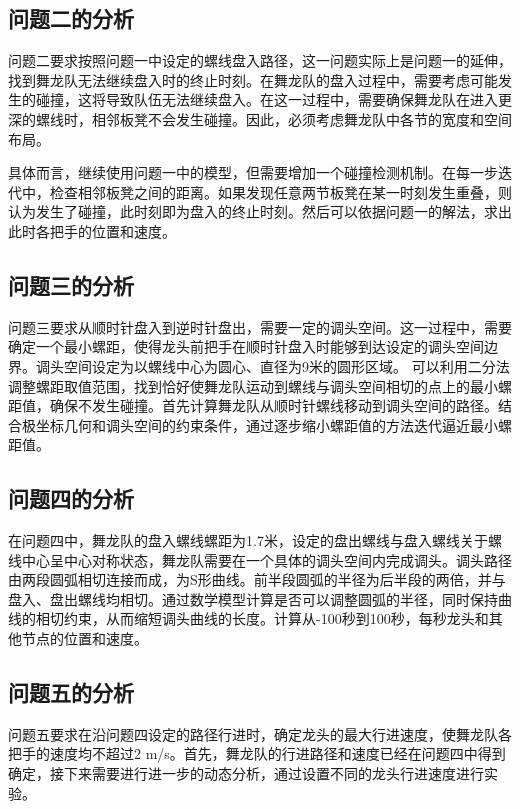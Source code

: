 \documentclass[withoutpreface, bwprint]{cumcmthesis} %
\begin{document}
\subsection{问题二的分析}

问题二要求按照问题一中设定的螺线盘入路径，这一问题实际上是问题一的延伸，找到舞龙队无法继续盘入时的终止时刻。在舞龙队的盘入过程中，需要考虑可能发生的碰撞，这将导致队伍无法继续盘入。在这一过程中，需要确保舞龙队在进入更深的螺线时，相邻板凳不会发生碰撞。因此，必须考虑舞龙队中各节的宽度和空间布局。

具体而言，继续使用问题一中的模型，但需要增加一个碰撞检测机制。在每一步迭代中，检查相邻板凳之间的距离。如果发现任意两节板凳在某一时刻发生重叠，则认为发生了碰撞，此时刻即为盘入的终止时刻。然后可以依据问题一的解法，求出此时各把手的位置和速度。

\subsection{问题三的分析}

问题三要求从顺时针盘入到逆时针盘出，需要一定的调头空间。这一过程中，需要确定一个最小螺距，使得龙头前把手在顺时针盘入时能够到达设定的调头空间边界。调头空间设定为以螺线中心为圆心、直径为9米的圆形区域。
可以利用二分法调整螺距取值范围，找到恰好使舞龙队运动到螺线与调头空间相切的点上的最小螺距值，确保不发生碰撞。首先计算舞龙队从顺时针螺线移动到调头空间的路径。结合极坐标几何和调头空间的约束条件，通过逐步缩小螺距值的方法迭代逼近最小螺距值。

\subsection{问题四的分析}

在问题四中，舞龙队的盘入螺线螺距为1.7米，设定的盘出螺线与盘入螺线关于螺线中心呈中心对称状态，舞龙队需要在一个具体的调头空间内完成调头。调头路径由两段圆弧相切连接而成，为S形曲线。前半段圆弧的半径为后半段的两倍，并与盘入、盘出螺线均相切。通过数学模型计算是否可以调整圆弧的半径，同时保持曲线的相切约束，从而缩短调头曲线的长度。计算从-100秒到100秒，每秒龙头和其他节点的位置和速度。

\subsection{问题五的分析}

问题五要求在沿问题四设定的路径行进时，确定龙头的最大行进速度，使舞龙队各把手的速度均不超过2 m/s。首先，舞龙队的行进路径和速度已经在问题四中得到确定，接下来需要进行进一步的动态分析，通过设置不同的龙头行进速度进行实验。
\end{document}
